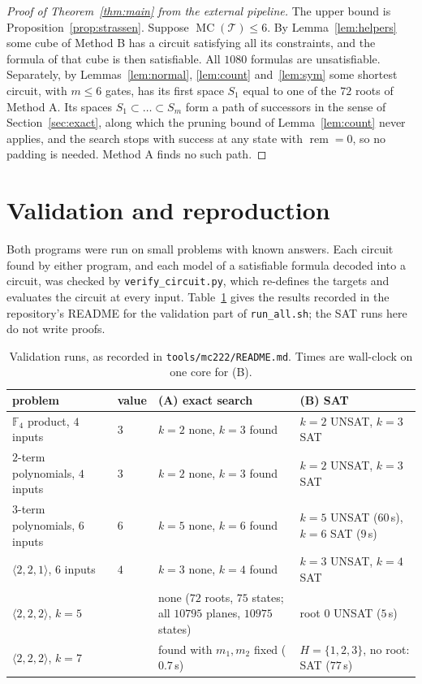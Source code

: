 \documentclass[11pt,a4paper]{article}
\theoremstyle{definition}
\newcommand{\F}{\mathbb{F}}
\newcommand{\Tg}{\mathcal{T}}
\newcommand{\MC}{\operatorname{MC}}
\newcommand{\rem}{\operatorname{rem}}
\newcommand{\code}[1]{\texttt{#1}}
\begin{document}
\begin{proof}[Proof of Theorem~\ref{thm:main} from the external pipeline]
The upper bound is Proposition~\ref{prop:strassen}. Suppose $\MC(\Tg)\le6$. By Lemma~\ref{lem:helpers} some cube of Method B has a circuit satisfying all its constraints, and the formula of that cube is then satisfiable. All $1080$ formulas are unsatisfiable. Separately, by Lemmas~\ref{lem:normal}, \ref{lem:count} and~\ref{lem:sym} some shortest circuit, with $m\le6$ gates, has its first space $S_1$ equal to one of the $72$ roots of Method A. Its spaces $S_1\subset\dots\subset S_m$ form a path of successors in the sense of Section~\ref{sec:exact}, along which the pruning bound of Lemma~\ref{lem:count} never applies, and the search stops with success at any state with $\rem=0$, so no padding is needed. Method A finds no such path.
\end{proof}

\section{Validation and reproduction}\label{sec:validation}

Both programs were run on small problems with known answers. Each circuit found by either program, and each model of a satisfiable formula decoded into a circuit, was checked by \code{verify\_circuit.py}, which re-defines the targets and evaluates the circuit at every input. Table~\ref{tab:val} gives the results recorded in the repository's README for the validation part of \code{run\_all.sh}; the SAT runs here do not write proofs.

\begin{table}[ht]
\centering
\footnotesize
\begin{tabular}{>{\raggedright}p{}>{\raggedright}p{}>{\raggedright}p{}>{\raggedright\arraybackslash}p{}}
\toprule
problem & value & (A) exact search & (B) SAT\\
\midrule
$\F_4$ product, $4$ inputs & $3$ & $k=2$ none, $k=3$ found & $k=2$ UNSAT, $k=3$ SAT\\
$2$-term polynomials, $4$ inputs & $3$ \cite{Morse26} & $k=2$ none, $k=3$ found & $k=2$ UNSAT, $k=3$ SAT\\
$3$-term polynomials, $6$ inputs & $6$ \cite{Morse26} & $k=5$ none, $k=6$ found & $k=5$ UNSAT ($60$\,s), $k=6$ SAT ($9$\,s)\\
$\langle2,2,1\rangle$, $6$ inputs & $4$ & $k=3$ none, $k=4$ found & $k=3$ UNSAT, $k=4$ SAT\\
$\langle2,2,2\rangle$, $k=5$ & & none ($72$ roots, $75$ states; all $10795$ planes, $10975$ states) & root $0$ UNSAT ($5$\,s)\\
$\langle2,2,2\rangle$, $k=7$ & & found with $m_1,m_2$ fixed ($0.7$\,s) & $H=\{1,2,3\}$, no root: SAT ($77$\,s)\\
\bottomrule
\end{tabular}
\caption{Validation runs, as recorded in \code{tools/mc222/README.md}. Times are wall-clock on one core for (B).}
\label{tab:val}
\end{table}
\end{document}
